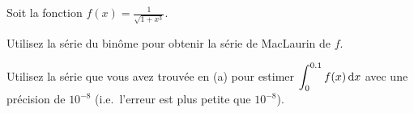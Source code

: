 \begin{question}
Soit la fonction $\displaystyle f(x) = \frac{1}{\sqrt{1+x^3}}$.

 Utilisez la série du binôme pour obtenir la série de
MacLaurin de $f$.

 Utilisez la série que vous avez trouvée en (a) pour
estimer $\displaystyle \int_0^{0.1} f(x) \,\mathrm{d}x$ avec une précision de
$10^{-8}$ (i.e.\ l'erreur est plus petite que $10^{-8}$).
\label{9Q18}
\end{question}


